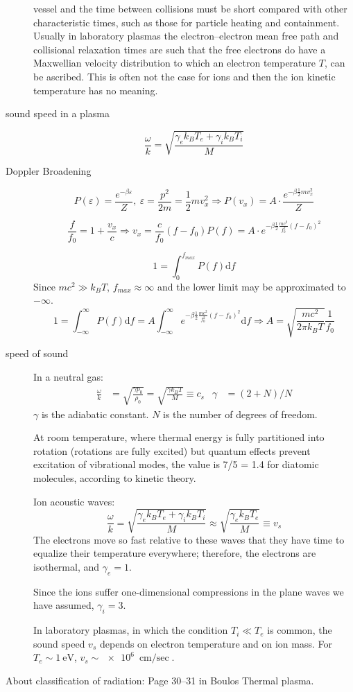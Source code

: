 \documentclass[openany]{book}
\begin{document}
\begin{description}
vessel and the time between collisions must be short compared with other characteristic times, such as those for particle heating and containment.
Usually in laboratory plasmas the electron--electron mean free path and collisional relaxation times are such that the free electrons do have a Maxwellian
velocity distribution to which an electron temperature $T$, can be ascribed.
This is often not the case for ions and then the ion kinetic temperature has no
meaning.
\item[sound speed in a plasma]
$$\frac{\omega}{k}=\sqrt{\frac{\gamma_e k_{B}T_{e}+\gamma_{i}k_{B}T_{i}}{M}}$$
\item[Doppler Broadening]
$$P\left(\varepsilon\right)=\frac{e^{-\beta\varepsilon}}{Z},\ \varepsilon=\frac{p^{2}}{2m}=\frac{1}{2}mv_{x}^{2}\Rightarrow P\left(v_{x}\right)=A\cdot\frac{e^{-\beta\frac{1}{2}mv_{x}^{2}}}{Z}$$

$$\frac{f}{f_{0}}=1+\frac{v_{x}}{c}\Rightarrow v_{x}=\frac{c}{f_{0}}\left(f-f_{0}\right)P\left(f\right)=A\cdot e^{-\beta\frac{1}{2}\frac{mc^{2}}{f_{0}^{2}}\left(f-f_{0}\right)^{2}}$$

$$1=\int_{0}^{f_{max}}P\left(f\right)\mathrm{d}f$$
Since $mc^{2}\gg k_{B}T$, $f_{max}\approx\infty$ and the lower limit may be approximated to $-\infty$.
$$1=\int_{-\infty}^{\infty}P\left(f\right)\mathrm{d}f=A\int_{-\infty}^{\infty}e^{-\beta\frac{1}{2}\frac{mc^{2}}{f_{0}^{2}}\left(f-f_{0}\right)^{2}}\mathrm{d}f\Rightarrow A=\sqrt{\frac{mc^{2}}{2\pi k_{B}T}}\frac{1}{f_{0}}$$
\item[speed of sound]
In a neutral gas:
\begin{align*}
  \frac{\omega}{k} &= \sqrt{\frac{\gamma p_{0}}{\rho_{0}}}=\sqrt{\frac{\gamma k_{B}T}{M}}\equiv c_{s} & \gamma &= (2+N)/N
\end{align*}
$\gamma$ is the adiabatic constant. $N$ is the number of degrees of freedom.

At room temperature, where thermal energy is fully partitioned into rotation (rotations are fully excited) but quantum effects prevent excitation of vibrational modes, the value is 7/5 = 1.4 for diatomic molecules, according to kinetic theory.

Ion acoustic waves:
$$\frac{\omega}{k}=\sqrt{\frac{\gamma_e k_B T_e+\gamma_i k_B T_i}{M}}\approx \sqrt{\frac{\gamma_e k_B T_e}{M}} \equiv v_{s}$$
The electrons move so fast relative to these waves that they have time to equalize their temperature everywhere; therefore, the electrons are isothermal, and $\gamma_e=1$.

Since the ions suffer one-dimensional compressions in the plane waves we have assumed, $\gamma_i=3$.

In laboratory plasmas, in which the condition $T_i\ll T_e$ is common, the sound speed $v_s$ depends on electron temperature and on ion mass. For $T_e\sim \SI{1}{\electronvolt}$, $v_s \sim \SI{e6}{\cm\per\sec}$.
\end{description}
About classification of radiation:
Page 30--31 in Boulos Thermal plasma.
\end{document}
